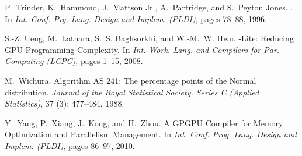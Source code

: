 \documentclass{sigplanconf}  %
\begin{document}
\begin{thebibliography}{49}
P.~Trinder, K.~Hammond, J.~{Mattson Jr.}, A.~Partridge, and S.~{Peyton Jones}.
.
\newblock In \emph{Int. Conf. Prg. Lang. Design and Implem. (PLDI)}, pages
  78--88, 1996.

S.-Z. Ueng, M.~Lathara, S.~S. Baghsorkhi, and W.-M.~W. Hwu.
-{L}ite: {R}educing {GPU} {P}rogramming {C}omplexity.
\newblock In \emph{Int. Work. Lang. and Compilers for Par. Computing (LCPC)},
  pages 1--15, 2008.

M.~Wichura.
\newblock Algorithm {AS} 241: {T}he percentage points of the {N}ormal
  distribution.
\newblock \emph{Journal of the Royal Statistical Society. Series C (Applied
  Statistics)}, 37 (3): 477--484, 1988.

Y.~Yang, P.~Xiang, J.~Kong, and H.~Zhou.
\newblock A {GPGPU} {C}ompiler for {M}emory {O}ptimization and {P}arallelism
  {M}anagement.
\newblock In \emph{Int. Conf. Prog. Lang. Design and Implem. (PLDI)}, pages
  86--97, 2010.

\end{thebibliography}
\end{document}
